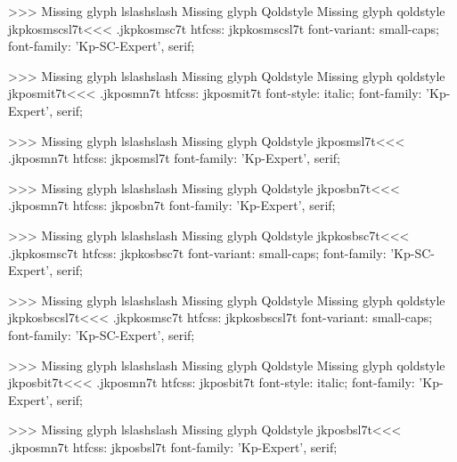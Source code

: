 >>>
Missing glyph	lslashslash
Missing glyph	Qoldstyle
Missing glyph	qoldstyle
\<jkpkosmscsl7t\><<<
.jkpkosmsc7t
htfcss:  jkpkosmscsl7t  font-variant: small-caps; font-family: 'Kp-SC-Expert', serif;

>>>
Missing glyph	lslashslash
Missing glyph	Qoldstyle
Missing glyph	qoldstyle
\<jkposmit7t\><<<
.jkposmn7t
htfcss:  jkposmit7t  font-style: italic; font-family: 'Kp-Expert', serif;

>>>
Missing glyph	lslashslash
Missing glyph	Qoldstyle
\<jkposmsl7t\><<<
.jkposmn7t
htfcss:  jkposmsl7t  font-family: 'Kp-Expert', serif;

>>>
Missing glyph	lslashslash
Missing glyph	Qoldstyle
\<jkposbn7t\><<<
.jkposmn7t
htfcss:  jkposbn7t  font-family: 'Kp-Expert', serif;

>>>
Missing glyph	lslashslash
Missing glyph	Qoldstyle
\<jkpkosbsc7t\><<<
.jkpkosmsc7t
htfcss:  jkpkosbsc7t  font-variant: small-caps; font-family: 'Kp-SC-Expert', serif;

>>>
Missing glyph	lslashslash
Missing glyph	Qoldstyle
Missing glyph	qoldstyle
\<jkpkosbscsl7t\><<<
.jkpkosmsc7t
htfcss:  jkpkosbscsl7t  font-variant: small-caps; font-family: 'Kp-SC-Expert', serif;

>>>
Missing glyph	lslashslash
Missing glyph	Qoldstyle
Missing glyph	qoldstyle
\<jkposbit7t\><<<
.jkposmn7t
htfcss:  jkposbit7t  font-style: italic; font-family: 'Kp-Expert', serif;

>>>
Missing glyph	lslashslash
Missing glyph	Qoldstyle
\<jkposbsl7t\><<<
.jkposmn7t
htfcss:  jkposbsl7t  font-family: 'Kp-Expert', serif;

